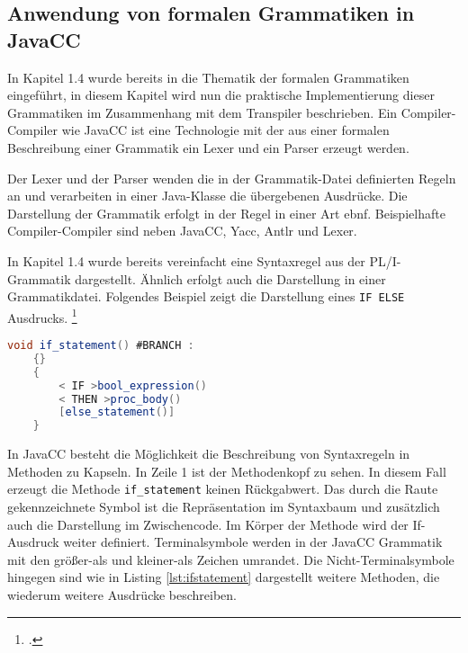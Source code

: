      
\pagebreak
\subsection{Anwendung von formalen Grammatiken in JavaCC}

In Kapitel 1.4 wurde bereits in die Thematik der formalen Grammatiken eingeführt, in diesem Kapitel wird nun die praktische Implementierung dieser Grammatiken im Zusammenhang mit dem Transpiler beschrieben.
Ein Compiler-Compiler wie JavaCC ist eine Technologie mit der aus einer formalen Beschreibung einer Grammatik ein Lexer und ein Parser erzeugt werden. 

Der Lexer und der Parser wenden die in der Grammatik-Datei definierten Regeln an und verarbeiten in einer Java-Klasse die übergebenen Ausdrücke.
Die Darstellung der Grammatik erfolgt in der Regel in einer Art \ac{ebnf}. 
Beispielhafte Compiler-Compiler sind neben JavaCC, Yacc, Antlr und Lexer.


In Kapitel 1.4 wurde bereits vereinfacht eine Syntaxregel aus der PL/I-Grammatik dargestellt. Ähnlich erfolgt auch die Darstellung in einer Grammatikdatei. Folgendes Beispiel zeigt die Darstellung eines \verb+IF ELSE+ Ausdrucks. 
\footcite[Vgl. ][]{javaccdoku}


\begin{lstlisting}[language=Java, caption=If Statement aus der Grammatikdatei, label={lst:ifstatement}]
	void if_statement() #BRANCH :
	{}
	{
		< IF >bool_expression()
		< THEN >proc_body()
		[else_statement()]
	}
\end{lstlisting}

In JavaCC besteht die Möglichkeit die Beschreibung von Syntaxregeln in Methoden zu Kapseln.
In Zeile 1 ist der Methodenkopf zu sehen. In diesem Fall erzeugt die Methode \verb+if_statement+ keinen Rückgabwert.
Das durch die Raute gekennzeichnete Symbol ist die Repräsentation im Syntaxbaum und zusätzlich auch die Darstellung im Zwischencode.
Im Körper der Methode wird der If-Ausdruck weiter definiert. Terminalsymbole werden in der JavaCC Grammatik mit den größer-als und kleiner-als Zeichen umrandet. Die Nicht-Terminalsymbole hingegen sind wie in Listing \ref{lst:ifstatement} dargestellt weitere Methoden, die wiederum weitere Ausdrücke beschreiben.

